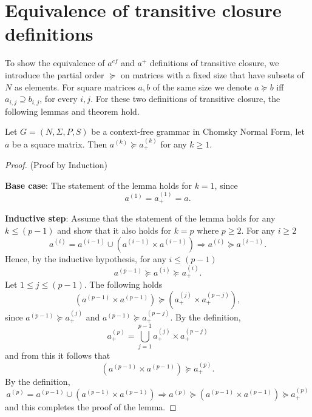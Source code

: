 \appendix
\section{Equivalence of transitive closure definitions}\label{def_eq}

To show the equivalence of $a^{cf}$ and $a^+$ definitions of transitive closure, we introduce the partial order $\succeq$ on matrices with a fixed size that have subsets of $N$ as elements. For square matrices $a, b$ of the same size we denote $a \succeq b$ iff $a_{i,j} \supseteq b_{i,j}$, for every $i, j$. For these two definitions of transitive closure, the following lemmas and theorem hold.

\begin{lemma}\label{lemma:cf_geq_valiant}
	Let $G =(N,\Sigma,P,S)$ be a context-free grammar in Chomsky Normal Form, let $a$ be a square matrix. Then $a^{(k)} \succeq a^{(k)}_+$ for any $k \geq 1$.
\end{lemma}
\begin{proof}(Proof by Induction)
	
	\textbf{Base case}: The statement of the lemma holds for $k = 1$, since $$a^{(1)} = a^{(1)}_+ = a.$$
	
	\textbf{Inductive step}: Assume that the statement of the lemma holds for any $k \leq (p - 1)$ and show that it also holds for $k = p$ where $p \geq 2$. For any $i \geq 2$ $$a^{(i)} = a^{(i-1)} \cup (a^{(i-1)} \times a^{(i-1)}) \Rightarrow a^{(i)} \succeq a^{(i-1)}.$$ Hence, by the inductive hypothesis, for any $i \leq (p-1)$ $$a^{(p-1)} \succeq a^{(i)} \succeq a^{(i)}_+.$$ Let $1 \leq j \leq (p - 1)$. The following holds $$(a^{(p-1)} \times a^{(p-1)}) \succeq (a^{(j)}_+ \times a^{(p-j)}_+),$$ since $a^{(p-1)} \succeq a^{(j)}_+$ and $a^{(p-1)} \succeq a^{(p-j)}_+$. By the definition, $$a^{(p)}_+ = \bigcup^{p-1}_{j=1}{a^{(j)}_+ \times a^{(p-j)}_+}$$ and from this it follows that $$(a^{(p-1)} \times a^{(p-1)}) \succeq a^{(p)}_+.$$ By the definition, $$a^{(p)} = a^{(p-1)} \cup (a^{(p-1)} \times a^{(p-1)}) \Rightarrow a^{(p)} \succeq (a^{(p-1)} \times a^{(p-1)}) \succeq a^{(p)}_+$$ and this completes the proof of the lemma.
\end{proof}

